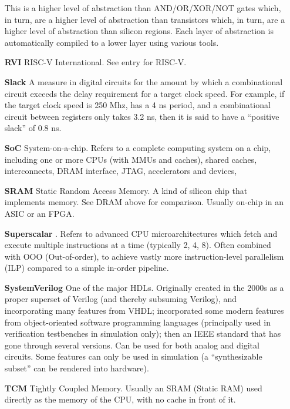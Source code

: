 \begin{itemize}
  This is a higher level of abstraction than AND/OR/XOR/NOT gates
  which, in turn, are a higher level of abstraction than transistors
  which, in turn, are a higher level of abstraction than silicon
  regions.  Each layer of abstraction is automatically compiled to a
  lower layer using various tools.

\item[\bf RVI] RISC-V International.  See entry for RISC-V.

\item[\bf Slack] A measure in digital circuits for the amount by which
  a combinational circuit exceeds the delay requirement for a target
  clock speed.  For example, if the target clock speed is 250 Mhz,
  {\ie} has a 4 ns period, and a combinational circuit between
  registers only takes 3.2 ns, then it is said to have a ``positive
  slack'' of 0.8 ns.

\item[\bf SoC] System-on-a-chip.  Refers to a complete computing
  system on a chip, including one or more CPUs (with MMUs and caches),
  shared caches, interconnects, DRAM interface, JTAG, accelerators and
  devices, {\etc}

\item[\bf SRAM] Static Random Access Memory.  A kind of silicon chip
  that implements memory.  See DRAM above for comparison.  Usually
  on-chip in an ASIC or an FPGA.

\item[\bf Superscalar].  Refers to advanced CPU microarchitectures
  which fetch and execute multiple instructions at a time (typically
  2, 4, 8).  Often combined with OOO (Out-of-order), to achieve vastly
  more instruction-level parallelism (ILP) compared to a simple
  in-order pipeline.

\item[\bf SystemVerilog] One of the major HDLs.  Originally created in
  the 2000s as a proper superset of Verilog (and thereby subsuming
  Verilog), and incorporating many features from VHDL; incorporated
  some modern features from object-oriented software programming
  languages (principally used in verification testbenches in
  simulation only); then an IEEE standard that has gone through
  several versions.  Can be used for both analog and digital circuits.
  Some features can only be used in simulation (a ``synthesizable
  subset'' can be rendered into hardware).

\item[\bf TCM] Tightly Coupled Memory. Usually an SRAM (Static RAM)
  used directly as the memory of the CPU, with no cache in front of
  it.


\end{itemize}
